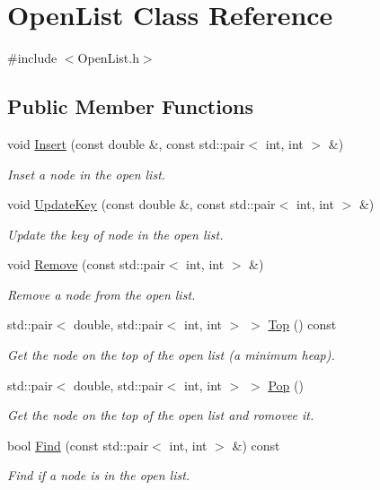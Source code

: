 \hypertarget{classOpenList}{}\section{Open\+List Class Reference}
\label{classOpenList}


{\ttfamily \#include $<$Open\+List.\+h$>$}

\subsection*{Public Member Functions}
\begin{DoxyCompactItemize}
\item 
void \hyperlink{classOpenList_a9fed98c24f74b3251baf50cda69c9028}{Insert} (const double \&, const std\+::pair$<$ int, int $>$ \&)
\begin{DoxyCompactList}\small\item\em Inset a node in the open list. \end{DoxyCompactList}\item 
void \hyperlink{classOpenList_a197566325e2a0df8ec00b6470752c7b7}{Update\+Key} (const double \&, const std\+::pair$<$ int, int $>$ \&)
\begin{DoxyCompactList}\small\item\em Update the key of node in the open list. \end{DoxyCompactList}\item 
void \hyperlink{classOpenList_a4452fe5d3a98a52df814ca76f017c9bd}{Remove} (const std\+::pair$<$ int, int $>$ \&)
\begin{DoxyCompactList}\small\item\em Remove a node from the open list. \end{DoxyCompactList}\item 
std\+::pair$<$ double, std\+::pair$<$ int, int $>$ $>$ \hyperlink{classOpenList_a7c4ed2e5e4ee02f789873059af2322fe}{Top} () const 
\begin{DoxyCompactList}\small\item\em Get the node on the top of the open list (a minimum heap). \end{DoxyCompactList}\item 
std\+::pair$<$ double, std\+::pair$<$ int, int $>$ $>$ \hyperlink{classOpenList_a6729ec1717dd8382b6054cc5dd2d873b}{Pop} ()
\begin{DoxyCompactList}\small\item\em Get the node on the top of the open list and romovee it. \end{DoxyCompactList}\item 
bool \hyperlink{classOpenList_aee52373704c36193c946c54a26cdd1b6}{Find} (const std\+::pair$<$ int, int $>$ \&) const 
\begin{DoxyCompactList}\small\item\em Find if a node is in the open list. \end{DoxyCompactList}\end{DoxyCompactItemize}


